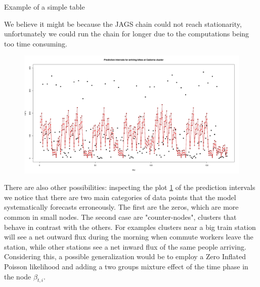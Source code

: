 \documentclass[11pt,twoside]{report}
\begin{document}
Example of a simple table


We believe it might be because the JAGS chain could not reach stationarity, unfortunately we could run the chain for longer due to the computations being too time consuming. \\

\begin{figure}[H]
	\centering
	\includegraphics[width=150 mm]{pictures/cadorna_nin.png}
	\caption{}
	\label{fig:network_pred}
\end{figure}

There are also other possibilities: inspecting the plot \ref{fig:network_pred} of the prediction intervals we notice that there are two main categories of data points that the model systematically forecasts erroneously. The first are the zeros, which are more common in small nodes. The second case are "counter-nodes", clusters that behave in contrast with the others. For examples clusters near a big train station will see a net outward flux during the morning when commute workers leave the station, while other stations see a net inward flux of the same people arriving. Considering this, a possible generalization would be to employ a Zero Inflated Poisson likelihood and adding a two groups mixture effect of the time phase in the node $\beta_{t,i}$. 
\end{document}
